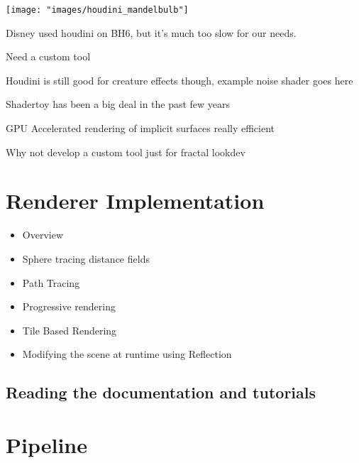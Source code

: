 \documentclass[11pt,a4paper,final,notitlepage]{report}
\begin{document}
\begin{center}
\texttt{[image: "images/houdini\_mandelbulb"]}
\end{center}

Disney used houdini on BH6, but it's much too slow for our needs.

Need a custom tool

Houdini is still good for creature effects though, example noise shader goes here

Shadertoy has been a big deal in the past few years

GPU Accelerated rendering of implicit surfaces really efficient

Why not develop a custom tool just for fractal lookdev


\chapter{Renderer Implementation}

\begin{itemize}
	\item Overview
	\item Sphere tracing distance fields
	\item Path Tracing
	\item Progressive rendering
	\item Tile Based Rendering
	\item Modifying the scene at runtime using Reflection
\end{itemize}



\section{Reading the documentation and tutorials}

\chapter{Pipeline}
\end{document}
